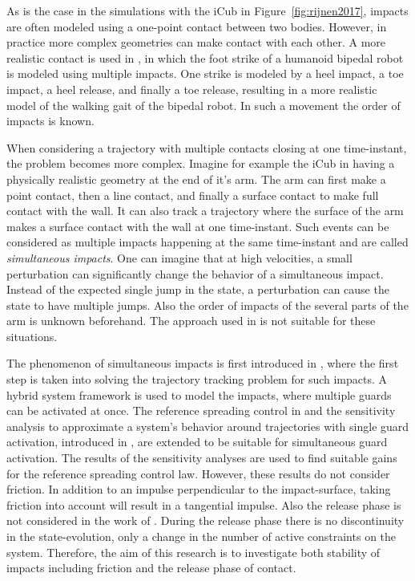 \documentclass[../DC2017114Bouma.tex]{subfiles}
\begin{document}
As is the case in the simulations with the iCub in Figure~\ref{fig:rijnen2017}, impacts are often modeled using a one-point contact between two bodies. However, in practice more complex geometries can make contact with each other. A more realistic contact is used in \cite{Zhao2015}, in which the foot strike of a humanoid bipedal robot is modeled using multiple impacts. One strike is modeled by a heel impact, a toe impact, a heel release, and finally a toe release, resulting in a more realistic model of the walking gait of the bipedal robot. In such a movement the order of impacts is known.

When considering a trajectory with multiple contacts closing at one time-instant, the problem becomes more complex. Imagine for example the iCub in \cite{Rijnen2017a} having a physically realistic geometry at the end of it's arm. The arm can first make a point contact, then a line contact, and finally a surface contact to make full contact with the wall. It can also track a trajectory where the surface of the arm makes a surface contact with the wall at one time-instant. Such events can be considered as multiple impacts happening at the same time-instant and are called \textit{simultaneous impacts}. One can imagine that at high velocities, a small perturbation can significantly change the behavior of a simultaneous impact. Instead of the expected single jump in the state, a perturbation can cause the state to have multiple jumps. Also the order of impacts of the several parts of the arm is unknown beforehand. The approach used in \cite{Zhao2015} is not suitable for these situations.

The phenomenon of simultaneous impacts is first introduced in \cite{Chen2018a}, where the first step is taken into solving the trajectory tracking problem for such impacts. A hybrid system framework is used to model the impacts, where multiple guards can be activated at once. The reference spreading control in \cite{Rijnen2016,Rijnen2017} and the sensitivity analysis to approximate a system's behavior around trajectories with single guard activation, introduced in \cite{Saccon2014}, are extended to be suitable for simultaneous guard activation. The results of the sensitivity analyses are used to find suitable gains for the reference spreading control law. However, these results do not consider friction. In addition to an impulse perpendicular to the impact-surface, taking friction into account will result in a tangential impulse. Also the release phase is not considered in the work of \cite{Chen2018a}. During the release phase there is no discontinuity in the state-evolution, only a change in the number of active constraints on the system. Therefore, the aim of this research is to investigate both stability of impacts including friction and the release phase of contact.
\end{document}

